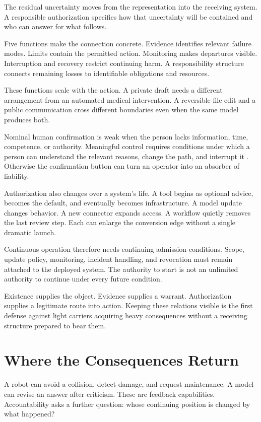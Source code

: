 \documentclass[11pt,openany]{book}
\begin{document}
The residual uncertainty moves from the representation into the receiving system. A responsible authorization specifies how that uncertainty will be contained and who can answer for what follows.

Five functions make the connection concrete. Evidence identifies relevant failure modes. Limits contain the permitted action. Monitoring makes departures visible. Interruption and recovery restrict continuing harm. A responsibility structure connects remaining losses to identifiable obligations and resources.

These functions scale with the action. A private draft needs a different arrangement from an automated medical intervention. A reversible file edit and a public communication cross different boundaries even when the same model produces both.

Nominal human confirmation is weak when the person lacks information, time, competence, or authority. Meaningful control requires conditions under which a person can understand the relevant reasons, change the path, and interrupt it \cite{santoni2018meaningful}. Otherwise the confirmation button can turn an operator into an absorber of liability.

Authorization also changes over a system's life. A tool begins as optional advice, becomes the default, and eventually becomes infrastructure. A model update changes behavior. A new connector expands access. A workflow quietly removes the last review step. Each can enlarge the conversion edge without a single dramatic launch.

Continuous operation therefore needs continuing admission conditions. Scope, update policy, monitoring, incident handling, and revocation must remain attached to the deployed system. The authority to start is not an unlimited authority to continue under every future condition.

Existence supplies the object. Evidence supplies a warrant. Authorization supplies a legitimate route into action. Keeping these relations visible is the first defense against light carriers acquiring heavy consequences without a receiving structure prepared to bear them.

\section{Where the Consequences Return}

A robot can avoid a collision, detect damage, and request maintenance. A model can revise an answer after criticism. These are feedback capabilities. Accountability asks a further question: whose continuing position is changed by what happened?
\end{document}
